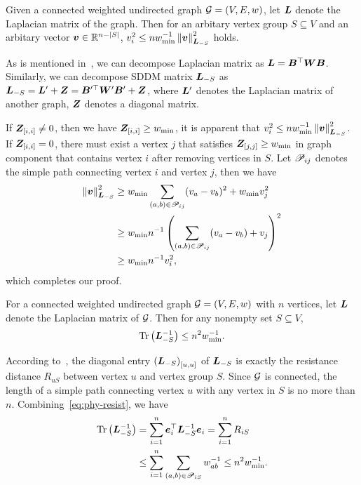 \documentclass[10pt,twocolumn,twoside]{IEEEtran}
\begin{document}
\begin{lemma}\label{lem:norm-ineq}
    Given a connected weighted undirected graph \(\mathcal{G}=(V,E,w)\), let \(\boldsymbol{L}\) denote the Laplacian matrix of the graph.
    Then for an arbitary vertex group \(S\subseteq V\) and an arbitary vector \(\boldsymbol{v}\in\mathbb{R}^{n-\left|S \right|}\), \(v_i^2\le nw_{\min}^{-1}\left\Vert\boldsymbol{v}\right\Vert^2_{\boldsymbol{L}_{-S}}\) holds.
\end{lemma}

\begin{IEEEproof}
    As is mentioned in~, we can decompose Laplacian matrix as \(\boldsymbol{L}=\boldsymbol{B}^\top\boldsymbol{W}\boldsymbol{B}\).
    Similarly, we can decompose SDDM matrix \(\boldsymbol{L}_{-S}\) as \(\boldsymbol{L}_{-S}=\boldsymbol{L}'+\boldsymbol{Z}=\boldsymbol{B}'^\top\boldsymbol{W}'\boldsymbol{B}'+\boldsymbol{Z}\), where \(\boldsymbol{L}'\) denotes the Laplacian matrix of another graph, \(\boldsymbol{Z}\) denotes a diagonal matrix.

    If \(\boldsymbol{Z}_{[i,i]}\neq0\), then we have \(\boldsymbol{Z}_{[i,i]}\ge w_{\min}\), it is apparent that \(v_i^2\le nw_{\min}^{-1}\left\Vert\boldsymbol{v}\right\Vert^2_{\boldsymbol{L}_{-S}}\).
    If \(\boldsymbol{Z}_{[i,i]}=0\), there must exist a vertex \(j\) that satisfies \(\boldsymbol{Z}_{[j,j]}\ge w_{\min}\) in graph component that contains vertex \(i\) after removing vertices in \(S\).
    Let \(\mathscr{P}_{ij}\) denotes the simple path connecting vertex \(i\) and vertex \(j\), then we have
    \begin{align*}
        \left\Vert\boldsymbol{v}\right\Vert^2_{\boldsymbol{L}_{-S}}
         & \ge w_{\min}\sum_{\left( a,b \right)\in\mathscr{P}_{ij}}(v_a-v_b)^2+w_{\min}v_j^2     \\
         & \ge w_{\min}n^{-1}\left( \sum_{\left( a,b \right)\in\mathscr{P}_{ij}}(v_a-v_b)+v_j \right)^2 \\
         & \ge w_{\min}n^{-1}v_i^2,
    \end{align*}
    which completes our proof.
\end{IEEEproof}

\begin{lemma}\label{lem:trace-lap}
    For a connected weighted undirected graph \(\mathcal{G}=(V,E,w)\) with \(n\) vertices, let \(\boldsymbol{L}\) denote the Laplacian matrix of \(\mathcal{G}\).
    Then for any nonempty set \(S\subseteq V\),
    \begin{equation*}
        \mathrm{Tr}\left(\boldsymbol{L}_{-S}^{-1}\right)\le n^2w_{\min}^{-1}.
    \end{equation*}
\end{lemma}

\begin{IEEEproof}
    According to~\cite{ClPo11}, the diagonal entry \(\left( \boldsymbol{L}_{-S} \right)_{[u,u]}\) of \(\boldsymbol{L}_{-S}\) is exactly the resistance distance \(R_{uS}\) between vertex \(u\) and vertex group \(S\).
    Since \(\mathcal{G}\) is connected, the length of a simple path connecting vertex \(u\) with any vertex in \(S\) is no more than \(n\).
    Combining~\eqref{eq:phy-resist}, we have
    \begin{align*}
        \mathrm{Tr}\left(\boldsymbol{L}_{-S}^{-1}\right) & =\sum_{i=1}^n\boldsymbol{e}_i^\top\boldsymbol{L}_{-S}^{-1}\boldsymbol{e}_i=\sum_{i=1}^nR_{iS}              \\
                               & \le\sum_{i=1}^n\sum_{\left( a,b \right)\in\mathscr{P}_{iS}}w_{ab}^{-1}\le n^2w_{\min}^{-1}.
    \end{align*}
\end{IEEEproof}
\end{document}

